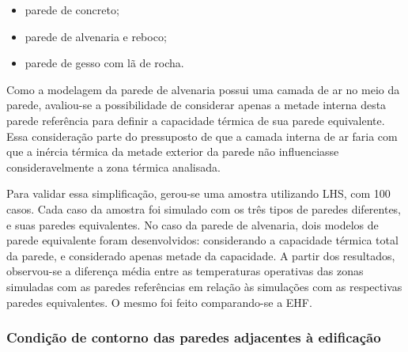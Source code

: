 \documentclass[brazil,hardcopy,openany,a5paper]{ufscthesis}
\begin{document}
		\begin{itemize}
			\item parede de concreto;
			\item parede de alvenaria e reboco;
			\item parede de gesso com lã de rocha.
		\end{itemize}
		
		Como a modelagem da parede de alvenaria possui uma camada de ar no meio da parede, avaliou-se a possibilidade de considerar apenas a metade interna desta parede referência para definir a capacidade térmica de sua parede equivalente. Essa consideração parte do pressuposto de que a camada interna de ar faria com que a inércia térmica da metade exterior da parede não influenciasse consideravelmente a zona térmica analisada.
		
		Para validar essa simplificação, gerou-se uma amostra utilizando LHS, com 100 casos.
		Cada caso da amostra foi simulado com os três tipos de paredes diferentes, e suas paredes equivalentes. No caso da parede de alvenaria, dois modelos de parede equivalente foram desenvolvidos: considerando a capacidade térmica total da parede, e considerado apenas metade da capacidade.		
		A partir dos resultados, observou-se a diferença média entre as temperaturas operativas das zonas simuladas com as paredes referências em relação às simulações com as respectivas paredes equivalentes. O mesmo foi feito comparando-se a EHF.
		
		\subsubsection{Condição de contorno das paredes adjacentes à edificação}
		
\end{document}

